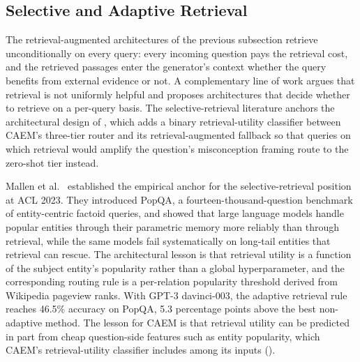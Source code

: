 \subsection{Selective and Adaptive Retrieval}
\label{sec:lit-selective-retrieval}

The retrieval-augmented architectures of the previous subsection retrieve unconditionally on every query: every incoming question pays the retrieval cost, and the retrieved passages enter the generator's context whether the query benefits from external evidence or not. A complementary line of work argues that retrieval is not uniformly helpful and proposes architectures that decide whether to retrieve on a per-query basis. The selective-retrieval literature anchors the architectural design of , which adds a binary retrieval-utility classifier between CAEM's three-tier router and its retrieval-augmented fallback so that queries on which retrieval would amplify the question's misconception framing route to the zero-shot tier instead.

Mallen et al.~\cite{mallen2023whennot} established the empirical anchor for the selective-retrieval position at ACL 2023. They introduced PopQA, a fourteen-thousand-question benchmark of entity-centric factoid queries, and showed that large language models handle popular entities through their parametric memory more reliably than through retrieval, while the same models fail systematically on long-tail entities that retrieval can rescue. The architectural lesson is that retrieval utility is a function of the subject entity's popularity rather than a global hyperparameter, and the corresponding routing rule is a per-relation popularity threshold derived from Wikipedia pageview ranks. With GPT-3 davinci-003, the adaptive retrieval rule reaches 46.5\% accuracy on PopQA, 5.3 percentage points above the best non-adaptive method. The lesson for CAEM is that retrieval utility can be predicted in part from cheap question-side features such as entity popularity, which CAEM's retrieval-utility classifier includes among its inputs ().

